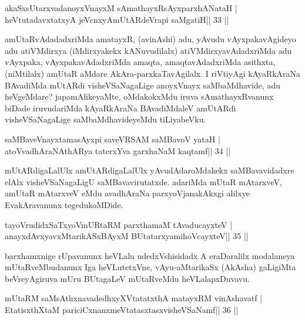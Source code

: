 \begin{shl}
akaSxsUtarxvadanoyxVnayxM sAmathayxRsAyxparxhANataH |
heVtutadavxtatxyA jeVcnxyA\s mUtARdeVrapi saMgatiH\hfill || 33 ||
\end{shl}

\begin{artha}
amUtaRvAdadadxriMda amatayxR, (avinAshi) adu, yAvudu vAyxpakavAgideyo
adu atiVMdirxya (iMdirxyakekx kANuvudilalx) atiVMdirxyavAdadxriMda
adu vAyxpaka, vAyxpakavAdadxriMda amaqta, amaqtavAdadxriMda asithxta,
(niMtilalx) amUtaR aMdare AkAra-parxkaTavAgilalx. I riVtiyAgi
kAyaRkAraNa BAvadiMda mUtARdi visheVSaNagaLige anoyxVnayx saMbaMdhavide,
adu heVgeMdare? japamAlikeyaMte, oMdakokxMdu iruva sAmathayxRvanunx
biDade iruvudariMda kAyaRkAraNa BAvadiMdaleV amUtARdi visheVSaNagaLige
saMbaMdhavideyeMdu tiLiyabeVku.
\end{artha}


\begin{shl}
saMBaveV\s nayxtamasAyxpi saveVRSAM saMBavoV yataH |
atoV\s vadhAraNAthARya taterxYva garxhaNaM kaqtamf\hfill || 34 ||
\end{shl}

\begin{artha}
mUtARdigaLalUlx amUtARdigaLalUlx yAvudAdaroMdakekx saMBavavidadxre elAlx visheVSaNagaLigU saMBavavirutatxde. adariMda mUtaR mAtarxveV, amUtaR mAtarxveV eMdu avadhAraNa parxyoVjanakAkxgi alilxye EvakAravanunx tegedukoMDide.
\end{artha}



\begin{shl}
tayoVrudidxSaTxyoVmURtaRM parxthamaM tAvaducayxteV |
anayxdAvxyavxMtarikASxBAyxM BUtatarxyamihoVcayxteV\hfill || 35 ||
\end{shl}

\begin{artha}
barxhamxnige rUpavanunx heVLalu udedxVshisidadx A eraDaralilx modalaneya mUtaRveMbudanunx Iga heVLutetxVne, vAyu-aMtarikaSx (AkAsha) gaLigiMta beVreyAgiruva mUru BUtagaLeV mUtaRveMdu heVLalapxDuvavu.
\end{artha}



\begin{shl}
mUtaRM saMsAthxnavadedhxyXVtatatxthA matayxRM vinAshavatf |
EtatisxthXtaM pariciCxnanxmeVtatasxtasxvisheVSaNamf\hfill || 36 ||
\end{shl}


